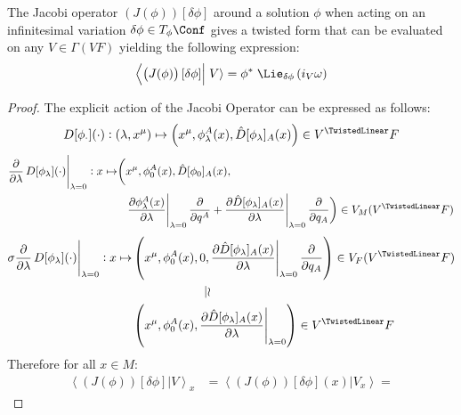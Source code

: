 \documentclass[a4paper,12pt,fleqn]{scrartcl}  %
\begin{document}
\begin{lemma}\label{Prop:JacobieLie}
	The Jacobi operator $\left(J(\phi) \right) [\delta \phi]$
	around a solution $\phi$ when acting on an infinitesimal variation $\delta \phi \in T_\phi \Conf$
	gives a twisted form that can be evaluated on any $V \in \Gamma\left(V F \right)$
	yielding the following expression:
	\begin{displaymath}	
		\left\langle \left(J(\phi) \right) [\delta \phi] \right\vert
		\left. V \right\rangle =
		\phi^\ast \; \Lie_{\delta \phi} \left( i_V \omega \right)
	\end{displaymath}
\end{lemma}
\begin{proof}
The explicit action of the Jacobi Operator can be expressed as follows:
\begin{displaymath}
	D[\phi_\cdot](\cdot): (\lambda, x^\mu) \mapsto
	\left( x^\mu, \phi_\lambda^A (x), \hat{D}[\phi_\lambda]_A(x) \right)
	\in V^\TwistedLinear F 
\end{displaymath}
%
\begin{align*}
	\frac{\partial}{\partial \lambda} \eval{D[\phi_\lambda](\cdot)}_{\lambda=0}:
	x \mapsto
	\biggr(& x^\mu, \phi_0^A(x), \hat{D}[\phi_0]_A(x),\\
	&	
	\eval{\dfrac{\partial \phi^A_\lambda(x)}{\partial \lambda}}_{\lambda=0}
	 \dfrac{\partial}{\partial q^A} + 
	\eval{\dfrac{\partial \hat{D}[\phi_\lambda]_A(x)}{\partial \lambda}}_{\lambda=0}
	 \dfrac{\partial}{\partial q_A}	  \biggr)
	 \in V_M(V^\TwistedLinear F)
\end{align*}
\begin{align*}
	\sigma \frac{\partial}{\partial \lambda} \eval{D[\phi_\lambda](\cdot)}_{\lambda=0}:
	x \mapsto &
	\left( x^\mu, \phi_0^A(x), 0,
	\eval{\dfrac{\partial \hat{D}[\phi_\lambda]_A(x)}{\partial \lambda}}_{\lambda=0}
	 \dfrac{\partial}{\partial q_A}	  \right)
	 \in V_F(V^\TwistedLinear F) \\
	 & \qquad \qquad \qquad \vert\wr \\
	 &
		\left( x^\mu, \phi_0^A(x),
			\eval{\dfrac{\partial \hat{D}[\phi_\lambda]_A(x)}{\partial \lambda}}_{\lambda=0} \right)
	 		\in V^\TwistedLinear F 
\end{align*}
	Therefore for all $x\in M$:
	\begin{align*}
		\left\langle \left(J(\phi) \right) [\delta \phi] \right\vert
		\left. V \right\rangle_x &=
		\left\langle \left(J(\phi) \right) [\delta \phi] (x) \right\vert
		\left. V_x \right\rangle =

\end{align*}
\end{proof}
\end{document}
